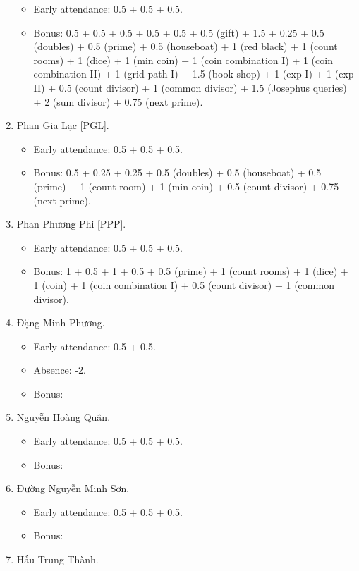 \documentclass{article}
\begin{document}
\begin{enumerate}
	\begin{itemize}
		\item Early attendance: 0.5 + 0.5 + 0.5.
		\item Bonus: 0.5 + 0.5 + 0.5 + 0.5 + 0.5 + 0.5 (gift) + 1.5 + 0.25 + 0.5 (doubles) + 0.5 (prime) + 0.5 (houseboat) + 1 (red black) + 1 (count rooms) + 1 (dice) + 1 (min coin) + 1 (coin combination I) + 1 (coin combination II) + 1 (grid path I) + 1.5 (book shop) + 1 (exp I) + 1 (exp II) + 0.5 (count divisor) + 1 (common divisor) + 1.5 (Josephus queries) + 2 (sum divisor) + 0.75 (next prime).
	\end{itemize}
	\item {\sc Phan Gia Lạc [PGL].}
	\begin{itemize}
		\item Early attendance: 0.5 + 0.5 + 0.5.
		\item Bonus: 0.5 + 0.25 + 0.25 + 0.5 (doubles) + 0.5 (houseboat) + 0.5 (prime) + 1 (count room) + 1 (min coin) + 0.5 (count divisor) + 0.75 (next prime).
	\end{itemize}
	\item {\sc Phan Phương Phi [PPP].}
	\begin{itemize}
		\item Early attendance: 0.5 + 0.5 + 0.5.
		\item Bonus: 1 + 0.5 + 1 + 0.5 + 0.5 (prime) + 1 (count rooms) + 1 (dice) + 1 (coin) + 1 (coin combination I) + 0.5 (count divisor) + 1 (common divisor).
	\end{itemize}
	\item {\sc Đặng Minh Phương.}
	\begin{itemize}
		\item Early attendance: 0.5 + 0.5.
		\item Absence: -2.
		\item Bonus: 
	\end{itemize}
	\item {\sc Nguyễn Hoàng Quân.}
	\begin{itemize}
		\item Early attendance: 0.5 + 0.5 + 0.5.
		\item Bonus: 
	\end{itemize}
	\item {\sc Đường Nguyễn Minh Sơn.}
	\begin{itemize}
		\item Early attendance: 0.5 + 0.5 + 0.5.
		\item Bonus: 
	\end{itemize}
	\item {\sc Hấu Trung Thành.}

\end{enumerate}
\end{document}
